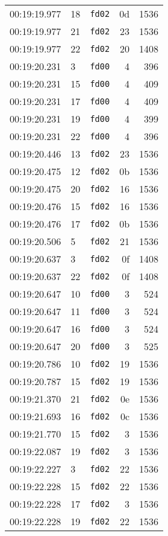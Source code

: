 \documentclass{article}
\begin{document}
\begin{longtable}{lllrr}
00:19:19.977 & 18 & \texttt{fd02} & 0d & 1536 \\
00:19:19.977 & 21 & \texttt{fd02} & 23 & 1536 \\
00:19:19.977 & 22 & \texttt{fd02} & 20 & 1408 \\
00:19:20.231 & 3 & \texttt{fd00} & 4 & 396 \\
00:19:20.231 & 15 & \texttt{fd00} & 4 & 409 \\
00:19:20.231 & 17 & \texttt{fd00} & 4 & 409 \\
00:19:20.231 & 19 & \texttt{fd00} & 4 & 399 \\
00:19:20.231 & 22 & \texttt{fd00} & 4 & 396 \\
00:19:20.446 & 13 & \texttt{fd02} & 23 & 1536 \\
00:19:20.475 & 12 & \texttt{fd02} & 0b & 1536 \\
00:19:20.475 & 20 & \texttt{fd02} & 16 & 1536 \\
00:19:20.476 & 15 & \texttt{fd02} & 16 & 1536 \\
00:19:20.476 & 17 & \texttt{fd02} & 0b & 1536 \\
00:19:20.506 & 5 & \texttt{fd02} & 21 & 1536 \\
00:19:20.637 & 3 & \texttt{fd02} & 0f & 1408 \\
00:19:20.637 & 22 & \texttt{fd02} & 0f & 1408 \\
00:19:20.647 & 10 & \texttt{fd00} & 3 & 524 \\
00:19:20.647 & 11 & \texttt{fd00} & 3 & 524 \\
00:19:20.647 & 16 & \texttt{fd00} & 3 & 524 \\
00:19:20.647 & 20 & \texttt{fd00} & 3 & 525 \\
00:19:20.786 & 10 & \texttt{fd02} & 19 & 1536 \\
00:19:20.787 & 15 & \texttt{fd02} & 19 & 1536 \\
00:19:21.370 & 21 & \texttt{fd02} & 0e & 1536 \\
00:19:21.693 & 16 & \texttt{fd02} & 0c & 1536 \\
00:19:21.770 & 15 & \texttt{fd02} & 3 & 1536 \\
00:19:22.087 & 19 & \texttt{fd02} & 3 & 1536 \\
00:19:22.227 & 3 & \texttt{fd02} & 22 & 1536 \\
00:19:22.228 & 15 & \texttt{fd02} & 22 & 1536 \\
00:19:22.228 & 17 & \texttt{fd02} & 3 & 1536 \\
00:19:22.228 & 19 & \texttt{fd02} & 22 & 1536 \\

\end{longtable}
\end{document}
